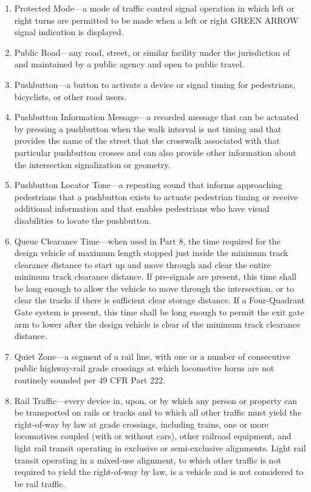 \documentclass[9pt]{memoir}
\begin{document}
{\begin{enumerate}[label=\arabic*., ref=\arabic*]
\item Protected Mode---a mode of traffic control signal operation in which left or right turns are permitted to be made when a left or right GREEN ARROW signal indication is displayed.
\item Public Road---any road, street, or similar facility under the jurisdiction of and maintained by a public agency and open to public travel.
\item Pushbutton---a button to activate a device or signal timing for pedestrians, bicyclists, or other road users.
\item Pushbutton Information Message---a recorded message that can be actuated by pressing a pushbutton when the walk interval is not timing and that provides the name of the street that the crosswalk associated with that particular pushbutton crosses and can also provide other information about the intersection signalization or geometry.
\item Pushbutton Locator Tone---a repeating sound that informs approaching pedestrians that a pushbutton exists to actuate pedestrian timing or receive additional information and that enables pedestrians who have visual disabilities to locate the pushbutton.
\item Queue Clearance Time---when used in Part 8, the time required for the design vehicle of maximum length stopped just inside the minimum track clearance distance to start up and move through and clear the entire minimum track clearance distance. If pre-signals are present, this time shall be long enough to allow the vehicle to move through the intersection, or to clear the tracks if there is sufficient clear storage distance. If a Four-Quadrant Gate system is present, this time shall be long enough to permit the exit gate arm to lower after the design vehicle is clear of the minimum track clearance distance.
\item Quiet Zone---a segment of a rail line, with one or a number of consecutive public highway-rail grade crossings at which locomotive horns are not routinely sounded per 49 CFR Part 222.
\item Rail Traffic---every device in, upon, or by which any person or property can be transported on rails or tracks and to which all other traffic must yield the right-of-way by law at grade crossings, including trains, one or more locomotives coupled (with or without cars), other railroad equipment, and light rail transit operating in exclusive or semi-exclusive alignments. Light rail transit operating in a mixed-use alignment, to which other traffic is not required to yield the right-of-way by law, is a vehicle and is not considered to be rail traffic.

\end{enumerate}}
\end{document}
